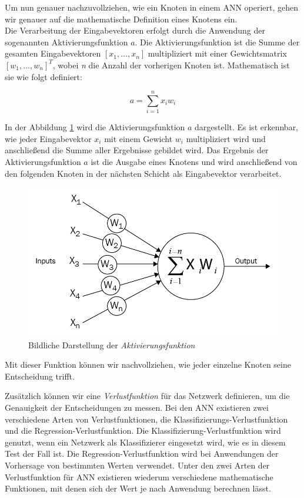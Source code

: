 Um nun genauer nachzuvollziehen, wie ein Knoten in einem ANN operiert, gehen wir genauer auf die mathematische Definition eines Knotens ein. \\
Die Verarbeitung der Eingabevektoren erfolgt durch die Anwendung der sogenannten Aktivierungsfunktion $a$. Die Aktivierungsfunktion ist die Summe der gesamten Eingabevektoren $[x_1,…,x_n]$ multipliziert mit einer Gewichtsmatrix $[w_1,...,w_n]^T$,
wobei \textit{n} die Anzahl der vorherigen Knoten ist. Mathematisch ist sie wie folgt definiert:

\[a = \sum_{i=1}^{n} x_i w_i\]

In der Abbildung \ref{fig:act_fun} wird die Aktivierungsfunktion $a$ dargestellt. Es ist erkennbar, wie jeder Eingabevektor $x_i$ mit einem Gewicht $w_i$ multipliziert wird und anschließend die Summe aller Ergebnisse gebildet wird. Das Ergebnis der Aktivierungsfunktion $a$ ist die Ausgabe eines Knotens und wird anschließend von den folgenden Knoten in der nächsten Schicht als Eingabevektor verarbeitet.

\begin{figure}[H]
    \centering
    \includegraphics[width=\imgMed]{images/theory/activationfunction.png}
    \caption{Bildliche Darstellung der \textit{Aktivierungsfunktion} \cite{Sewak2018}}
    \label{fig:act_fun}
\end{figure}

Mit dieser Funktion können wir nachvollziehen, wie jeder einzelne Knoten seine Entscheidung trifft.\cite*{Braspenning1995}

Zusätzlich können wir eine \textit{Verlustfunktion} für das Netzwerk definieren, um die Genauigkeit der Entscheidungen zu messen. Bei den ANN existieren zwei verschiedene Arten von Verlustfunktionen, die Klassifizierungs-Verlustfunktion und die Regression-Verlustfunktion.
Die Klassifizierung-Verlustfunktion wird genutzt, wenn ein Netzwerk als Klassifizierer eingesetzt wird, wie es in diesem Test der Fall ist. Die Regression-Verlustfunktion wird bei Anwendungen der Vorhersage von bestimmten Werten verwendet.
Unter den zwei Arten der Verlustfunktion für ANN existieren wiederum verschiedene mathematische Funktionen, mit denen sich der Wert je nach Anwendung berechnen lässt.\cite{dwivedi_2020}

